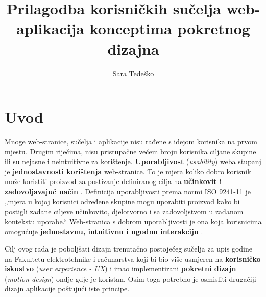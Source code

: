 \documentclass[times, utf8, zavrsni, numeric]{fer}
\begin{document}

\title{Prilagodba korisničkih sučelja web-aplikacija konceptima pokretnog dizajna}

\author{Sara Tedeško}

\maketitle



\noindent{}

\tableofcontents

\chapter{Uvod}
Mnoge web-stranice, sučelja i aplikacije nisu rađene s idejom korisnika na prvom mjestu. Drugim riječima, nisu pristupačne većem broju korisnika ciljane skupine ili su nejasne i neintuitivne za korištenje. \textbf{Uporabljivost} (\textit{usability}) weba stupanj je \textbf{jednostavnosti korištenja} web-stranice. To je mjera koliko dobro korisnik može koristiti proizvod za postizanje definiranog cilja na \textbf{učinkovit i zadovoljavajuć način} \cite{usability}. Definicija uporabljivosti prema normi ISO 9241-11 je „mjera u kojoj korisnici određene skupine mogu uporabiti proizvod kako bi postigli zadane ciljeve učinkovito, djelotvorno i sa zadovoljstvom u zadanom kontekstu uporabe.“ \cite{citat} Web-stranica s dobrom uporabljivosti je ona koja korisnicima omogućuje \textbf{jednostavnu, intuitivnu i ugodnu interakciju} \cite{usability2}.


Cilj ovog rada je poboljšati dizajn trenutačno postojećeg sučelja za upis godine na Fakultetu elektrotehnike i računarstva koji bi bio više usmjeren na \textbf{korisničko iskustvo} (\textit{user experience - UX}) i imao implementirani \textbf{pokretni dizajn} (\textit{motion design}) ondje gdje je koristan. Osim toga potrebno je osmisliti drugačiji dizajn aplikacije poštujući iste principe.
\end{document}
